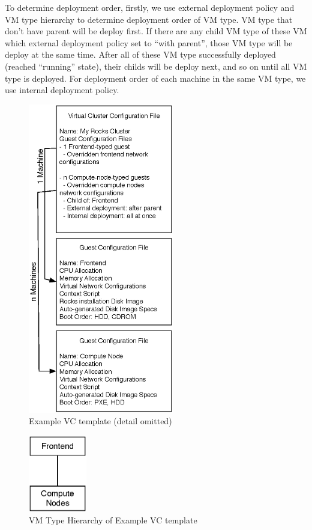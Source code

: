 \documentclass[conference]{IEEEtran}
\begin{document}
To determine deployment order, firstly, we use external deployment policy and VM type hierarchy to determine deployment order of VM type.
VM type that don't have parent will be deploy first.
If there are any child VM type of these VM which external deployment policy set to ``with parent'', those VM type will be deploy at the same time.
After all of these VM type successfully deployed (reached ``running'' state), their childs will be deploy next, and so on until all VM type is deployed.
For deployment order of each machine in the same VM type, we use internal deployment policy.

\begin{figure}[!t]
\centering
\includegraphics[width=2.5in]{template}
\caption{Example VC template (detail omitted)}
\label{fig:template}
\end{figure}

\begin{figure}[!t]
\centering
\includegraphics[width=1in]{hierarchy}
\caption{VM Type Hierarchy of Example VC template}
\label{fig:hierarchy}
\end{figure}
\end{document}
